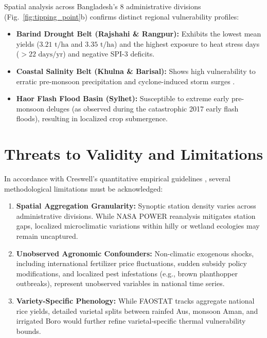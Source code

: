 \documentclass[conference]{IEEEtran}
\begin{document}
Spatial analysis across Bangladesh's 8 administrative divisions (Fig.~\ref{fig:tipping_point}b) confirms distinct regional vulnerability profiles:
\begin{itemize}
    \item \textbf{Barind Drought Belt (Rajshahi \& Rangpur):} Exhibits the lowest mean yields ($3.21\text{ t/ha}$ and $3.35\text{ t/ha}$) and the highest exposure to heat stress days ($>22\text{ days/yr}$) and negative SPI-3 deficits.
    \item \textbf{Coastal Salinity Belt (Khulna \& Barisal):} Shows high vulnerability to erratic pre-monsoon precipitation and cyclone-induced storm surges \cite{islam2019climate}.
    \item \textbf{Haor Flash Flood Basin (Sylhet):} Susceptible to extreme early pre-monsoon deluges (as observed during the catastrophic 2017 early flash floods), resulting in localized crop submergence.
\end{itemize}

\section{Threats to Validity and Limitations}
In accordance with Creswell's quantitative empirical guidelines \cite{creswell2018research}, several methodological limitations must be acknowledged:
\begin{enumerate}
    \item \textbf{Spatial Aggregation Granularity:} Synoptic station density varies across administrative divisions. While NASA POWER reanalysis mitigates station gaps, localized microclimatic variations within hilly or wetland ecologies may remain uncaptured.
    \item \textbf{Unobserved Agronomic Confounders:} Non-climatic exogenous shocks, including international fertilizer price fluctuations, sudden subsidy policy modifications, and localized pest infestations (e.g., brown planthopper outbreaks), represent unobserved variables in national time series.
    \item \textbf{Variety-Specific Phenology:} While FAOSTAT tracks aggregate national rice yields, detailed varietal splits between rainfed Aus, monsoon Aman, and irrigated Boro would further refine varietal-specific thermal vulnerability bounds.
\end{enumerate}
\end{document}
